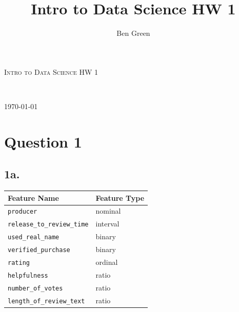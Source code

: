 \documentclass{article}
\author{Ben Green}
\title{Intro to Data Science HW 1}
\begin{document}
\begin{titlepage}
	\begin{center}
	\textsc{\LARGE Intro to Data Science HW 1}\\
	\vspace{3mm}
	
	{\large \theauthor}\\
	
	\tableofcontents
	\setcounter{secnumdepth}{0}
	\vfill
	
	{\large \today}
	\end{center}

\end{titlepage}

\section{Question 1}

\subsection{1a.}
\begin{table}[h]
\begin{center}
\begin{tabular}{ll}
Feature Name                                    & Feature Type                  \\ \hline
\multicolumn{1}{|l|}{\texttt{producer}}                  & \multicolumn{1}{l|}{nominal}  \\ \hline
\multicolumn{1}{|l|}{\texttt{release\_to\_review\_time}} & \multicolumn{1}{l|}{interval} \\ \hline
\multicolumn{1}{|l|}{\texttt{used\_real\_name}}          & \multicolumn{1}{l|}{binary}   \\ \hline
\multicolumn{1}{|l|}{\texttt{verified\_purchase}}        & \multicolumn{1}{l|}{binary}   \\ \hline
\multicolumn{1}{|l|}{\texttt{rating}}                    & \multicolumn{1}{l|}{{ordinal}}  \\ \hline
\multicolumn{1}{|l|}{\texttt{helpfulness}}               & \multicolumn{1}{l|}{ratio}  \\ \hline
\multicolumn{1}{|l|}{\texttt{number\_of\_votes}}         & \multicolumn{1}{l|}{ratio}    \\ \hline
\multicolumn{1}{|l|}{\texttt{length\_of\_review\_text}}  & \multicolumn{1}{l|}{ratio}    \\ \hline
\end{tabular}
\end{center}
\end{table}
\end{document}
